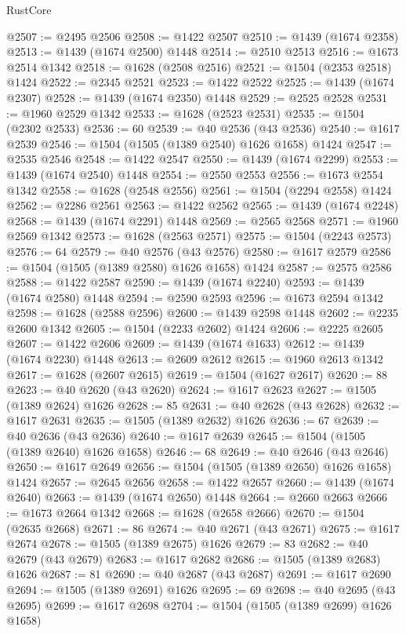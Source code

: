 \begin{lexlean}{RustCore}
\begin{coremodule}
@2507 := @2495 @2506
@2508 := @1422 @2507
@2510 := @1439 (@1674 @2358)
@2513 := @1439 (@1674 @2500) @1448
@2514 := @2510 @2513
@2516 := @1673 @2514 @1342
@2518 := @1628 (@2508 @2516)
@2521 := @1504 (@2353 @2518) @1424
@2522 := @2345 @2521
@2523 := @1422 @2522
@2525 := @1439 (@1674 @2307)
@2528 := @1439 (@1674 @2350) @1448
@2529 := @2525 @2528
@2531 := @1960 @2529 @1342
@2533 := @1628 (@2523 @2531)
@2535 := @1504 (@2302 @2533)
@2536 := 60
@2539 := @40 @2536 (@43 @2536)
@2540 := @1617 @2539
@2546 := @1504 (@1505 (@1389 @2540) @1626 @1658) @1424
@2547 := @2535 @2546
@2548 := @1422 @2547
@2550 := @1439 (@1674 @2299)
@2553 := @1439 (@1674 @2540) @1448
@2554 := @2550 @2553
@2556 := @1673 @2554 @1342
@2558 := @1628 (@2548 @2556)
@2561 := @1504 (@2294 @2558) @1424
@2562 := @2286 @2561
@2563 := @1422 @2562
@2565 := @1439 (@1674 @2248)
@2568 := @1439 (@1674 @2291) @1448
@2569 := @2565 @2568
@2571 := @1960 @2569 @1342
@2573 := @1628 (@2563 @2571)
@2575 := @1504 (@2243 @2573)
@2576 := 64
@2579 := @40 @2576 (@43 @2576)
@2580 := @1617 @2579
@2586 := @1504 (@1505 (@1389 @2580) @1626 @1658) @1424
@2587 := @2575 @2586
@2588 := @1422 @2587
@2590 := @1439 (@1674 @2240)
@2593 := @1439 (@1674 @2580) @1448
@2594 := @2590 @2593
@2596 := @1673 @2594 @1342
@2598 := @1628 (@2588 @2596)
@2600 := @1439 @2598 @1448
@2602 := @2235 @2600 @1342
@2605 := @1504 (@2233 @2602) @1424
@2606 := @2225 @2605
@2607 := @1422 @2606
@2609 := @1439 (@1674 @1633)
@2612 := @1439 (@1674 @2230) @1448
@2613 := @2609 @2612
@2615 := @1960 @2613 @1342
@2617 := @1628 (@2607 @2615)
@2619 := @1504 (@1627 @2617)
@2620 := 88
@2623 := @40 @2620 (@43 @2620)
@2624 := @1617 @2623
@2627 := @1505 (@1389 @2624) @1626
@2628 := 85
@2631 := @40 @2628 (@43 @2628)
@2632 := @1617 @2631
@2635 := @1505 (@1389 @2632) @1626
@2636 := 67
@2639 := @40 @2636 (@43 @2636)
@2640 := @1617 @2639
@2645 := @1504 (@1505 (@1389 @2640) @1626 @1658)
@2646 := 68
@2649 := @40 @2646 (@43 @2646)
@2650 := @1617 @2649
@2656 := @1504 (@1505 (@1389 @2650) @1626 @1658) @1424
@2657 := @2645 @2656
@2658 := @1422 @2657
@2660 := @1439 (@1674 @2640)
@2663 := @1439 (@1674 @2650) @1448
@2664 := @2660 @2663
@2666 := @1673 @2664 @1342
@2668 := @1628 (@2658 @2666)
@2670 := @1504 (@2635 @2668)
@2671 := 86
@2674 := @40 @2671 (@43 @2671)
@2675 := @1617 @2674
@2678 := @1505 (@1389 @2675) @1626
@2679 := 83
@2682 := @40 @2679 (@43 @2679)
@2683 := @1617 @2682
@2686 := @1505 (@1389 @2683) @1626
@2687 := 81
@2690 := @40 @2687 (@43 @2687)
@2691 := @1617 @2690
@2694 := @1505 (@1389 @2691) @1626
@2695 := 69
@2698 := @40 @2695 (@43 @2695)
@2699 := @1617 @2698
@2704 := @1504 (@1505 (@1389 @2699) @1626 @1658)

\end{coremodule}
\end{lexlean}
